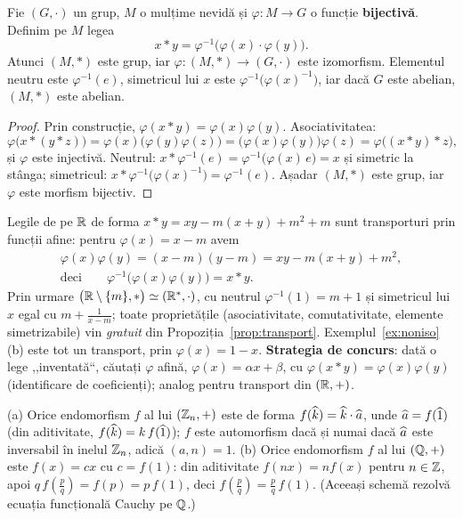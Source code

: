 \begin{propozitie}\label{prop:transport}
Fie $(G,\cdot)$ un grup, $M$ o mulțime nevidă și $\varphi:M\to G$ o funcție \textbf{bijectivă}. Definim pe $M$ legea
\[
x*y=\varphi^{-1}\bigl(\varphi(x)\cdot\varphi(y)\bigr).
\]
Atunci $(M,*)$ este grup, iar $\varphi:(M,*)\to(G,\cdot)$ este izomorfism. Elementul neutru este $\varphi^{-1}(e)$, simetricul lui $x$ este $\varphi^{-1}\bigl(\varphi(x)^{-1}\bigr)$, iar dacă $G$ este abelian, $(M,*)$ este abelian.
\end{propozitie}

\begin{proof}
Prin construcție, $\varphi(x*y)=\varphi(x)\varphi(y)$. Asociativitatea:
\[
\varphi\bigl(x*(y*z)\bigr)=\varphi(x)\bigl(\varphi(y)\varphi(z)\bigr)=\bigl(\varphi(x)\varphi(y)\bigr)\varphi(z)=\varphi\bigl((x*y)*z\bigr),
\]
și $\varphi$ este injectivă. Neutrul: $x*\varphi^{-1}(e)=\varphi^{-1}\bigl(\varphi(x)\,e\bigr)=x$ și simetric la stânga; simetricul: $x*\varphi^{-1}\bigl(\varphi(x)^{-1}\bigr)=\varphi^{-1}(e)$. Așadar $(M,*)$ este grup, iar $\varphi$ este morfism bijectiv.
\end{proof}

\begin{exemplu}\label{ex:transport}
Legile de pe $\mathbb{R}$ de forma $x*y=xy-m(x+y)+m^2+m$ sunt transporturi prin funcții afine: pentru $\varphi(x)=x-m$ avem
\[
\begin{gathered}
\varphi(x)\varphi(y)=(x-m)(y-m)=xy-m(x+y)+m^2,\\
\text{deci}\qquad \varphi^{-1}\bigl(\varphi(x)\varphi(y)\bigr)=x*y.
\end{gathered}
\]
Prin urmare $\bigl(\mathbb{R}\setminus\{m\},*\bigr)\simeq(\mathbb{R}^*,\cdot)$, cu neutrul $\varphi^{-1}(1)=m+1$ și simetricul lui $x$ egal cu $m+\frac{1}{x-m}$; toate proprietățile (asociativitate, comutativitate, elemente simetrizabile) vin \emph{gratuit} din Propoziția~\ref{prop:transport}. Exemplul~\ref{ex:noniso}(b) este tot un transport, prin $\varphi(x)=1-x$. \textbf{Strategia de concurs}: dată o lege ,,inventată``, căutați $\varphi$ afină, $\varphi(x)=\alpha x+\beta$, cu $\varphi(x*y)=\varphi(x)\varphi(y)$ (identificare de coeficienți); analog pentru transport din $(\mathbb{R},+)$.
\end{exemplu}

\begin{observatie}\label{obs:endo}
(a) Orice endomorfism $f$ al lui $(\mathbb{Z}_n,+)$ este de forma $f(\widehat{k})=\widehat{k}\cdot\widehat{a}$, unde $\widehat{a}=f(\widehat{1})$ (din aditivitate, $f(\widehat{k})=k\,f(\widehat{1})$); $f$ este automorfism dacă și numai dacă $\widehat{a}$ este inversabil în inelul $\mathbb{Z}_n$, adică $(a,n)=1$.
(b) Orice endomorfism $f$ al lui $(\mathbb{Q},+)$ este $f(x)=cx$ cu $c=f(1)$: din aditivitate $f(nx)=nf(x)$ pentru $n\in\mathbb{Z}$, apoi $q\,f\!\left(\frac pq\right)=f(p)=p\,f(1)$, deci $f\!\left(\frac pq\right)=\frac pq\,f(1)$. (Aceeași schemă rezolvă ecuația funcțională Cauchy pe $\mathbb{Q}$.)
\end{observatie}

